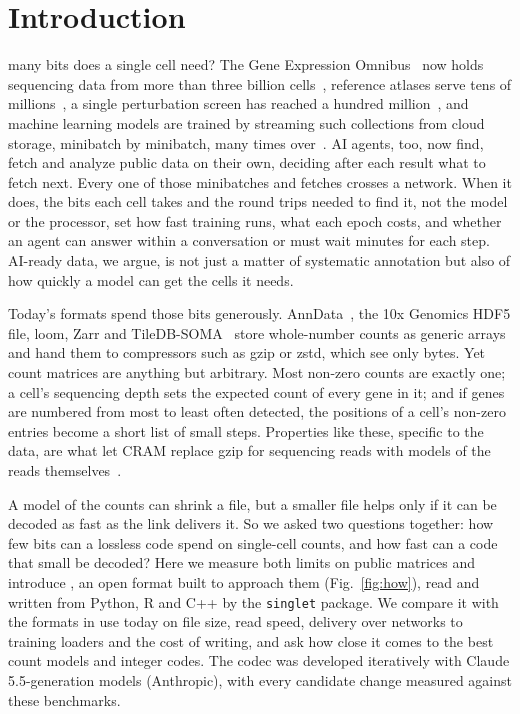 \section{Introduction}
\label{sec:intro}

 many bits does a single cell need? The Gene Expression Omnibus~\cite{barrett2013geo} now holds sequencing data from more than three billion cells~\cite{seqout}, reference atlases serve tens of
millions~\cite{svensson2018exponential,sikkema2023integrated,czi2025cellxgene}, a single perturbation screen has reached a
hundred million~\cite{zhang2025tahoe}, and machine learning models are trained by streaming such collections from cloud
storage, minibatch by minibatch, many times over~\cite{lopez2018deep,theodoris2023transfer,cui2024scgpt}. AI agents,
too, now find, fetch and analyze public data on their own, deciding after each result what to fetch next. Every one of
those minibatches and fetches crosses a network. When it does, the bits each cell takes and the round trips needed to find
it, not the model or the processor, set how fast training runs, what each epoch costs, and whether an agent can answer
within a conversation or must wait minutes for each step. AI-ready data, we argue, is not just a matter of systematic
annotation but also of how quickly a model can get the cells it needs.

Today's formats spend those bits generously. AnnData~\cite{virshup2024anndata}, the 10x Genomics HDF5 file, loom, Zarr and
TileDB-SOMA~\cite{tiledbsoma} store whole-number counts as generic arrays and hand them to compressors such as gzip or
zstd, which see only bytes. Yet count matrices are anything but arbitrary. Most non-zero counts are exactly one; a cell's
sequencing depth sets the expected count of every gene in it; and if genes are numbered from most to least often
detected, the positions of a cell's non-zero entries become a short list of small steps. Properties like these, specific
to the data, are what let CRAM replace gzip for sequencing reads with models of the reads
themselves~\cite{bonfield2022cram}.

A model of the counts can shrink a file, but a smaller file helps only if it can be decoded as fast as the link delivers
it. So we asked two questions together: how few bits can a lossless code spend on single-cell counts, and how fast can a
code that small be decoded? Here we measure both limits on  public matrices and introduce \sone, an open
format built to approach them (Fig.~\ref{fig:how}), read and written from Python, R and C++ by the \texttt{singlet}
package. We compare it with the formats in use today on file size, read speed, delivery over networks to training
loaders and the cost of writing, and ask how close it comes to the best count models and integer codes. The codec was
developed iteratively with Claude 5.5-generation models (Anthropic), with every candidate change measured against these
benchmarks.


